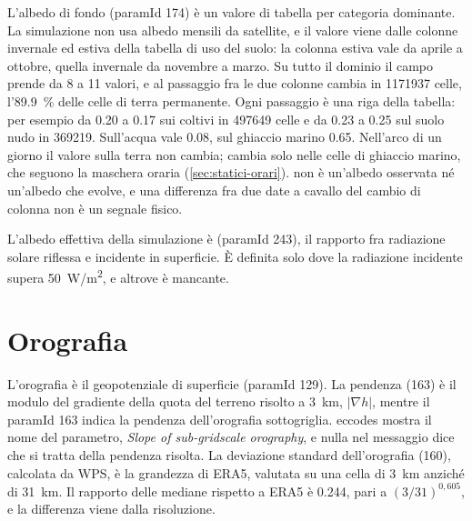 L'albedo di fondo  (paramId 174) è un valore di tabella per categoria dominante. La
simulazione non usa albedo mensili da satellite, e il valore viene dalle colonne invernale ed estiva
della tabella di uso del suolo: la colonna estiva vale da aprile a ottobre, quella invernale da
novembre a marzo. Su tutto il dominio il campo prende da 8 a 11 valori, e al passaggio fra le due
colonne cambia in \num{1171937} celle, l'\SI{89.9}{\percent} delle celle di terra permanente. Ogni passaggio è una riga
della tabella: per esempio da \num{0.20} a \num{0.17} sui coltivi in \num{497649} celle e da
\num{0.23} a \num{0.25} sul suolo nudo in \num{369219}. Sull'acqua vale \num{0.08}, sul ghiaccio
marino \num{0.65}. Nell'arco di un giorno il valore sulla terra non cambia; cambia solo nelle celle di
ghiaccio marino, che seguono la maschera oraria (\cref{sec:statici-orari}).  non è
un'albedo osservata né un'albedo che evolve, e una differenza fra due date a cavallo del cambio di
colonna non è un segnale fisico.

L'albedo effettiva della simulazione è  (paramId 243), il rapporto fra radiazione solare
riflessa e incidente in superficie. È definita solo dove la radiazione incidente supera
\SI{50}{W/m^2}, e altrove è mancante.

\section{Orografia}
\label{sec:orografia}

L'orografia è il geopotenziale di superficie  (paramId 129). La pendenza  (163)
è il modulo del gradiente della quota del terreno risolto a \SI{3}{km}, $|\nabla h|$, mentre il
paramId 163 indica la pendenza dell'orografia sottogriglia. eccodes mostra il nome del parametro,
\emph{Slope of sub-gridscale orography}, e nulla nel messaggio dice che si tratta della pendenza
risolta. La deviazione standard dell'orografia  (160), calcolata da WPS, è la grandezza
di ERA5, valutata su una cella di \SI{3}{km} anziché di \SI{31}{km}. Il rapporto delle mediane
rispetto a ERA5 è \num{0.244}, pari a $(3/31)^{0{,}605}$, e la differenza viene dalla risoluzione.
